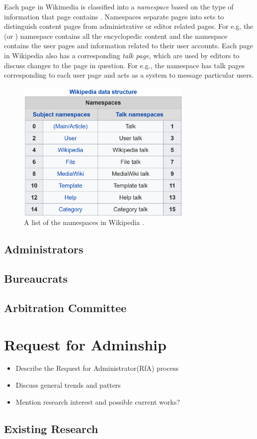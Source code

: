 Each page in Wikimedia is classified into a \textit{namespace} based on the type of information that page contains \cite{wiki:namespace}. Namespaces separate pages into sets to distinguish content pages from administrative or editor related pages. For e.g, the \mainNS (or \articleNS) namespace contains all the encyclopedic content and the \userNS namespace contains the user pages and information related to their user accounts. Each page in Wikipedia also has a corresponding \textit{talk page}, which are used by editors to discuss changes to the page in question. For e.g., the \usertalkNS namespace has talk pages corresponding to each user page and acts as a system to message particular users. 
\begin{figure}[htp]
    \centering
    \includegraphics[width=0.75\textwidth]{images/namespaces.PNG}
    \caption{A list of the namespaces in Wikipedia \cite{wiki:namespace}.}
    \label{fig:namespace}
\end{figure}
\subsection{Administrators}
\subsection{Bureaucrats}
\subsection{Arbitration Committee}



\section{Request for Adminship}
\begin{itemize}
    \item Describe the Request for Administrator(RfA) process
    \item Discuss general trends and patters
    \item Mention research interest and possible current works?
\end{itemize}

\subsection{Existing Research}